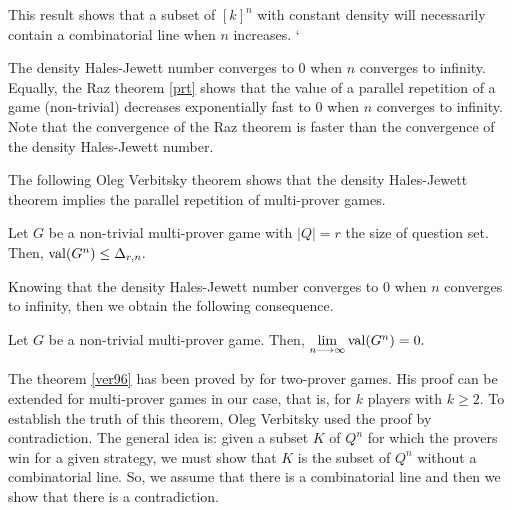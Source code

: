 
 
This result shows that  a subset of $[k]^n$ with constant density 
will  necessarily contain  a combinatorial line when $n$ increases.
`

The density Hales-Jewett number converges to $0$ when $n$ converges to infinity. Equally, the Raz theorem \eqref{prt} shows that the value of a parallel repetition of a game (non-trivial) decreases exponentially  fast to $0$ when $n$ converges to infinity.  Note that the convergence of the Raz theorem is faster than the convergence of the  density Hales-Jewett number.
  
The following Oleg Verbitsky theorem  shows that the density Hales-Jewett theorem implies the parallel repetition of multi-prover games.

\begin{thm}	 Let $G$ be a non-trivial multi-prover game with $|Q|=r$ the size of question set. Then, 
  $\mathrm{val} (G^n) \leq \Delta_{r,n}.$	\label{ver96} \end{thm}

Knowing that the density Hales-Jewett number converges to $0$ when $n$ converges to infinity, then we obtain the following consequence.
\begin{cor}	Let $G$ be a non-trivial multi-prover game. Then, $\lim\limits_{n\longrightarrow \infty} \mathrm{val} (G^n)=0.$ 	\end{cor}

The theorem \eqref{ver96}  has been proved by \cite{verbitsky1996towards} for two-prover games.  His proof can be extended for  multi-prover games in our case,  that is, for $k$ players with $k\geq 2.$ To establish the truth of  this theorem, Oleg Verbitsky used the proof by contradiction. The general idea is: given a subset $K$ of $Q^n$ for which the provers win   for a given strategy, we must show that $K$ is  the subset  of $Q^n$ without a combinatorial line.
So, we assume that there is a combinatorial line and then we show that there is a  contradiction.

